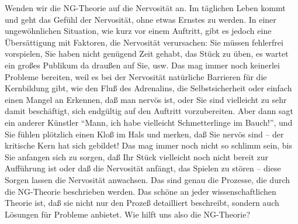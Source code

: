 Wenden wir die NG-Theorie auf die Nervosität an.
Im täglichen Leben kommt und geht das Gefühl der Nervosität, ohne etwas Ernstes zu werden.
In einer ungewöhnlichen Situation, wie kurz vor einem Auftritt, gibt es jedoch eine Übersättigung mit Faktoren, die Nervosität verursachen: Sie müssen fehlerfrei vorspielen, Sie haben nicht genügend Zeit gehabt, das Stück zu üben, es wartet ein großes Publikum da draußen auf Sie, usw.
Das mag immer noch keinerlei Probleme bereiten, weil es bei der Nervosität natürliche Barrieren für die Kernbildung gibt, wie den Fluß des Adrenalins, die Selbstsicherheit oder einfach einen Mangel an Erkennen, daß man nervös ist, oder Sie sind vielleicht zu sehr damit beschäftigt, sich endgültig auf den Auftritt vorzubereiten.
Aber dann sagt ein anderer Künstler \enquote{Mann, ich habe vielleicht Schmetterlinge im Bauch!}, und Sie fühlen plötzlich einen Kloß im Hals und merken, daß Sie nervös sind -- der kritische Kern hat sich gebildet!
Das mag immer noch nicht so schlimm sein, bis Sie anfangen sich zu sorgen, daß Ihr Stück vielleicht noch nicht bereit zur Aufführung ist oder daß die Nervosität anfängt, das Spielen zu stören -- diese Sorgen lassen die Nervosität anwachsen.
Das sind genau die Prozesse, die durch die NG-Theorie beschrieben werden.
Das schöne an jeder wissenschaftlichen Theorie ist, daß sie nicht nur den Prozeß detailliert beschreibt, sondern auch Lösungen für Probleme anbietet.
Wie hilft uns also die NG-Theorie?

